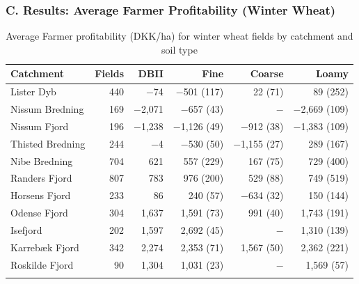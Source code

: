 \documentclass[t,24pt,aspectratio=169]{beamer}
\begin{document}
\begin{frame}[hvid]
\frametitle{\vspace{-3ex}C. Results: Average Farmer Profitability (Winter Wheat)}

\vspace{-2ex} \begin{table}[H]
\centering
\small
\caption*{Average Farmer profitability (DKK/ha) for winter wheat fields by catchment and soil type}
\label{tab:dbii-vinterhvede}
\begin{tabular}{lrrrrr}
\toprule
\textbf{Catchment} & \textbf{Fields} & \textbf{DBII} & \textbf{Fine} &
\textbf{Coarse} & \textbf{Loamy} \\
\midrule\addlinespace
Lister Dyb                 & 440 &  $-$74   & $-$501 (117)  &    22 (71)    &    89 (252) \\
Nissum Bredning            & 169 & $-$2,071 & $-$657 (43)   & $-$            & $-$2,669 (109) \\
Nissum Fjord  & 196 & $-$1,238 & $-$1,126 (49) & $-$912 (38)   & $-$1,383 (109) \\
Thisted Bredning           & 244 &   $-$4   & $-$530 (50)   & $-$1,155 (27) &    289 (167) \\
Nibe Bredning  & 704 &   621    &   557 (229)   &   167 (75)    &    729 (400) \\
Randers Fjord       & 807 &   783    &   976 (200)   &   529 (88)    &    749 (519) \\
Horsens Fjord       & 233 &    86    &   240 (57)    & $-$634 (32)   &    150 (144) \\
Odense Fjord & 304 & 1,637    & 1,591 (73)    &   991 (40)    & 1,743 (191) \\
Isefjord            & 202 & 1,597    & 2,692 (45)    & $-$            & 1,310 (139) \\
Karrebæk Fjord             & 342 & 2,274    & 2,353 (71)    & 1,567 (50)    & 2,362 (221) \\
Roskilde Fjord      &  90 & 1,304    & 1,031 (23)    & $-$            & 1,569 (57) \\
\addlinespace\bottomrule
\end{tabular}
\end{table}
\end{frame}
\end{document}
